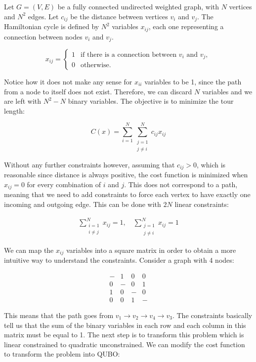 \documentclass[12pt,a4paper]{report}
\begin{document}
\noindent
Let \( G = (V, E) \) be a fully connected undirected weighted graph, with \( N \) vertices and \( N^2 \) edges. Let \( c_{ij} \) be the distance between vertices \( v_i \) and \( v_j \). The Hamiltonian cycle is defined by \( N^2 \) variables \( x_{ij} \), each one representing a connection between nodes \( v_i \) and \( v_j \). 

\[
x_{ij} = 
\begin{cases} 
1 & \text{if there is a connection between } v_i \text{ and } v_j, \\
0 & \text{otherwise.}
\end{cases}
\]

\noindent
Notice how it does not make any sense for \( x_{ii} \) variables to be 1, since the path from a node to itself does not exist. Therefore, we can discard \( N \) variables and we are left with \( N^2 - N \) binary variables. The objective is to minimize the tour length:

\[
C(x) = \sum_{i=1}^{N} \sum_{\substack{j=1 \\ j \neq i}}^{N} c_{ij}x_{ij}
\]

\noindent
Without any further constraints however, assuming that \( c_{ij} > 0 \), which is reasonable since distance is always positive, the cost function is minimized when \( x_{ij} = 0 \) for every combination of \( i \) and \( j \). This does not correspond to a path, meaning that we need to add constraints to force each vertex to have exactly one incoming and outgoing edge. This can be done with \( 2N \) linear constraints:

\begin{align*}
\sum_{\substack{i=1 \\ i \neq j}}^{N} x_{ij} = 1, \quad \sum_{\substack{j=1 \\ j \neq i}}^{N} x_{ij} = 1
\end{align*}

\newpage
\noindent
We can map the \(x_{ij}\) variables into a square matrix in order to obtain a more intuitive way to understand the constraints. Consider a graph with 4 nodes:

\[
\begin{array}{cccc}
- & 1 & 0 & 0 \\
0 & - & 0 & 1 \\
1 & 0 & - & 0 \\
0 & 0 & 1 & -
\end{array}
\]

\noindent
This means that the path goes from \(v_1 \rightarrow v_2 \rightarrow v_4 \rightarrow v_3\). The constraints basically tell us that the sum of the binary variables in each row and each column in this matrix must be equal to 1. The next step is to transform this problem which is linear constrained to quadratic unconstrained. We can modify the cost function to transform the problem into QUBO:
\end{document}
